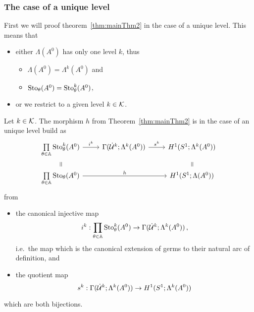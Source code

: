 \subsubsection{The case of a unique level}
First we will proof theorem~\ref{thm:mainThm2} in the case of a unique level.
This means that
\begin{itemize}
  \item either $\Lambda(A^0)$ has only one level $k$, thus
    \begin{itemize}
      \item $\Lambda(A^0)=\Lambda^k(A^0)$ and
      \item $\operatorname{Sto}_\theta(A^0)=\operatorname{Sto}_\theta^k(A^0)$,
    \end{itemize}
  \item or we restrict to a given level $k\in\mathcal{K}$.
\end{itemize}
\begin{lem}
  Let $k\in\mathcal{K}$.
  The morphism $h$ from Theorem~\ref{thm:mainThm2} is in the case of an unique
  level build as
  \[ \begin{tikzcd}[row sep=0cm]
    \underset{\theta\in\A}\prod\Sto_\theta^k(A^0)
    \rar{i^k}
    & \Gamma(\dot\cU^k;\Lambda^k(A^0))
    \rar{s^k}
    & H^1(S^1;\Lambda^k(A^0))
    \\
    \text{\rotatebox[origin=c]{-90}{$=$}}
    &&
    \text{\rotatebox[origin=c]{-90}{$=$}}
    \\
    \underset{\theta\in\A}\prod\Sto_\theta(A^0)
    \arrow{rr}{h}
    &
    & H^1(S^1;\Lambda(A^0))
  \end{tikzcd} \]
  from
  \begin{itemize}
    \item the canonical injective map
      \[
        i^k:\underset{\theta\in\mathbb{A}}\prod\operatorname{Sto}_\theta^k(A^0) \to
        \Gamma(\dot{\mathcal{U}}^k;\Lambda^k(A^0)) \,,
      \]
      i.e.\ the map which is the canonical extension of germs to their natural
      arc of definition, and
    \item the quotient map
      \[
        s^k:\Gamma(\dot{\mathcal{U}}^k;\Lambda^k(A^0))\to H^1(S^1;\Lambda^k(A^0))
      \]
  \end{itemize}
  which are both bijections.
\end{lem}
